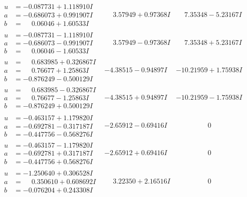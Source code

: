 \documentclass[1p]{elsarticle_modified}
\theoremstyle{definition}
\begin{document}
$$\begin{array}{c|c|c}
\begin{aligned}
u &= -0.087731 + 1.118910 I \\
a &= -0.686073 + 0.991907 I \\
b &= \phantom{-}0.06046 + 1.60533 I\end{aligned}
 & \phantom{-}3.57949 + 0.97368 I & \phantom{-}7.35348 - 5.23167 I \\ \hline\begin{aligned}
u &= -0.087731 - 1.118910 I \\
a &= -0.686073 - 0.991907 I \\
b &= \phantom{-}0.06046 - 1.60533 I\end{aligned}
 & \phantom{-}3.57949 - 0.97368 I & \phantom{-}7.35348 + 5.23167 I \\ \hline\begin{aligned}
u &= \phantom{-}0.683985 + 0.326867 I \\
a &= \phantom{-}0.76677 + 1.25863 I \\
b &= -0.876249 - 0.500129 I\end{aligned}
 & -4.38515 - 0.94897 I & -10.21959 + 1.75938 I \\ \hline\begin{aligned}
u &= \phantom{-}0.683985 - 0.326867 I \\
a &= \phantom{-}0.76677 - 1.25863 I \\
b &= -0.876249 + 0.500129 I\end{aligned}
 & -4.38515 + 0.94897 I & -10.21959 - 1.75938 I \\ \hline\begin{aligned}
u &= -0.463157 + 1.179820 I \\
a &= -0.692781 - 0.317187 I \\
b &= -0.447756 - 0.568276 I\end{aligned}
 & -2.65912 - 0.69416 I & \phantom{-0.000000 } 0 \\ \hline\begin{aligned}
u &= -0.463157 - 1.179820 I \\
a &= -0.692781 + 0.317187 I \\
b &= -0.447756 + 0.568276 I\end{aligned}
 & -2.65912 + 0.69416 I & \phantom{-0.000000 } 0 \\ \hline\begin{aligned}
u &= -1.250640 + 0.306528 I \\
a &= \phantom{-}0.350610 + 0.608692 I \\
b &= -0.076204 + 0.243308 I\end{aligned}
 & \phantom{-}3.22350 + 2.16516 I & \phantom{-0.000000 } 0 \\ \hline\begin{aligned}

\end{aligned}
\end{array}$$
\end{document}
